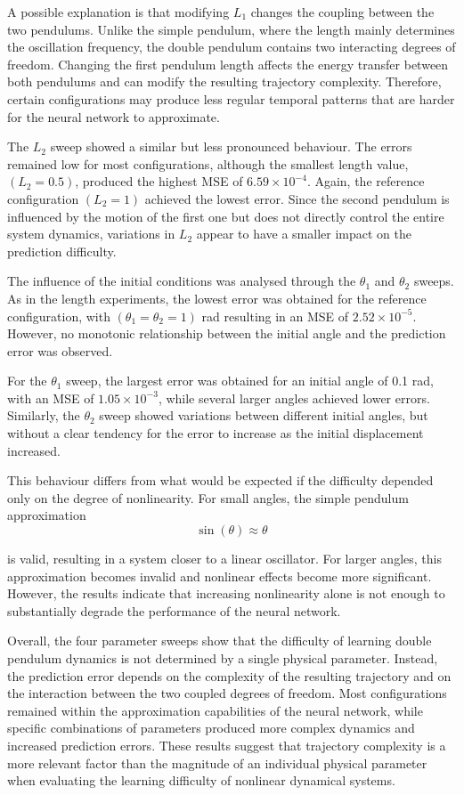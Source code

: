 A possible explanation is that modifying $L_1$ changes the coupling between the two pendulums. Unlike the simple pendulum, where the length mainly determines the oscillation frequency, the double pendulum contains two interacting degrees of freedom. Changing the first pendulum length affects the energy transfer between both pendulums and can modify the resulting trajectory complexity. Therefore, certain configurations may produce less regular temporal patterns that are harder for the neural network to approximate.

The $L_2$ sweep showed a similar but less pronounced behaviour. The errors remained low for most configurations, although the smallest length value, $(L_2=0.5)$, produced the highest MSE of $6.59\times10^{-4}$. Again, the reference configuration $(L_2=1)$ achieved the lowest error. Since the second pendulum is influenced by the motion of the first one but does not directly control the entire system dynamics, variations in $L_2$ appear to have a smaller impact on the prediction difficulty.

The influence of the initial conditions was analysed through the $\theta_1$ and $\theta_2$ sweeps. As in the length experiments, the lowest error was obtained for the reference configuration, with $(\theta_1=\theta_2=1)$ rad resulting in an MSE of $2.52\times10^{-5}$. However, no monotonic relationship between the initial angle and the prediction error was observed.

For the $\theta_1$ sweep, the largest error was obtained for an initial angle of 0.1 rad, with an MSE of $1.05\times10^{-3}$, while several larger angles achieved lower errors. Similarly, the $\theta_2$ sweep showed variations between different initial angles, but without a clear tendency for the error to increase as the initial displacement increased.

This behaviour differs from what would be expected if the difficulty depended only on the degree of nonlinearity. For small angles, the simple pendulum approximation
\begin{equation}
    \sin(\theta)\approx\theta
\end{equation}

is valid, resulting in a system closer to a linear oscillator. For larger angles, this approximation becomes invalid and nonlinear effects become more significant. However, the results indicate that increasing nonlinearity alone is not enough to substantially degrade the performance of the neural network.

Overall, the four parameter sweeps show that the difficulty of learning double pendulum dynamics is not determined by a single physical parameter. Instead, the prediction error depends on the complexity of the resulting trajectory and on the interaction between the two coupled degrees of freedom. Most configurations remained within the approximation capabilities of the neural network, while specific combinations of parameters produced more complex dynamics and increased prediction errors. These results suggest that trajectory complexity is a more relevant factor than the magnitude of an individual physical parameter when evaluating the learning difficulty of nonlinear dynamical systems.

